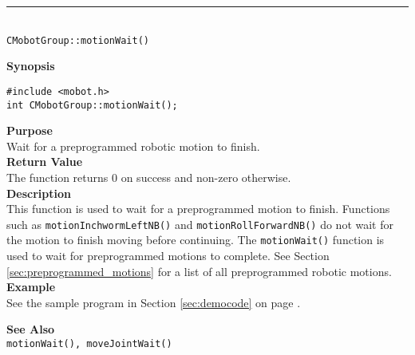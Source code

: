 \noindent
\vspace{5pt}
\rule{4.5in}{0.015in}\\
\noindent
{\LARGE \texttt{CMobotGroup::motionWait()}}\\
{}

\noindent
{\bf Synopsis}
\vspace{-8pt}
\begin{verbatim}
#include <mobot.h>
int CMobotGroup::motionWait();
\end{verbatim}

\noindent
{\bf Purpose}\\
Wait for a preprogrammed robotic motion to finish.\\

\noindent
{\bf Return Value}\\
The function returns 0 on success and non-zero otherwise.\\

\noindent
{\bf Description}\\
This function is used to wait for a preprogrammed motion to finish. Functions such as
\texttt{motionInchwormLeftNB()} and \texttt{motionRollForwardNB()} do not wait for the motion to finish
moving before continuing. The
\texttt{motionWait()} function is used to wait for
preprogrammed motions to complete. See Section \ref{sec:preprogrammed_motions} for 
a list of all preprogrammed robotic motions.\\

\noindent
{\bf Example}\\
See the sample program in Section \ref{sec:democode} on page \pageref{sec:democode}.
\noindent

\noindent
{\bf See Also}\\
\texttt{motionWait(), moveJointWait()}

